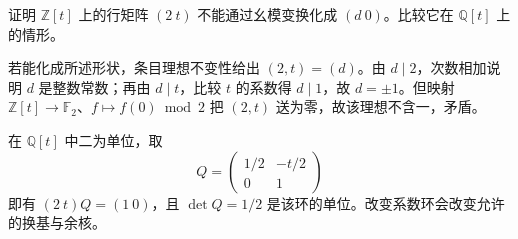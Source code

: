 \begin{exercise}\label{b2:ex:A-integral-polynomial-obstruction}
	证明 \(\mathbb Z[t]\) 上的行矩阵 \((2\ t)\) 不能通过幺模变换化成 \((d\ 0)\)。比较它在 \(\mathbb Q[t]\) 上的情形。
\end{exercise}
\begin{solution}
	若能化成所述形状，条目理想不变性给出 \((2,t)=(d)\)。由 \(d\mid2\)，次数相加说明 \(d\) 是整数常数；再由 \(d\mid t\)，比较 \(t\) 的系数得 \(d\mid1\)，故 \(d=\pm1\)。但映射 \(\mathbb Z[t]\to\mathbb F_2\)、\(f\mapsto f(0)\bmod2\) 把 \((2,t)\) 送为零，故该理想不含一，矛盾。

	在 \(\mathbb Q[t]\) 中二为单位，取
	\[
		Q=\begin{pmatrix}1/2&-t/2\\0&1\end{pmatrix}
	\]
	即有 \((2\ t)Q=(1\ 0)\)，且 \(\det Q=1/2\) 是该环的单位。改变系数环会改变允许的换基与余核。
\end{solution}

